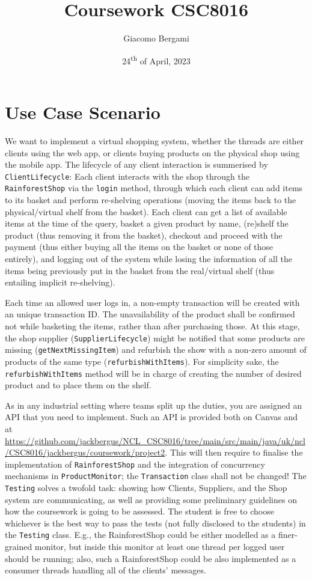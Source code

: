 \documentclass{article}
\title{Coursework CSC8016}
\author{Giacomo Bergami}
\date{24\textsuperscript{th} of April, 2023}
\begin{document}
	\maketitle
	
	\section*{Use Case Scenario}
We want to implement a virtual shopping system, whether the threads are
either clients using the web app, or clients buying products on the physical shop using the mobile app. The lifecycle of any client interaction is summerised by \texttt{ClientLifecycle}: Each client interacts with the shop through the \texttt{RainforestShop} via the \texttt{login} method, through which each client can add items to its basket and perform re-shelving operations (moving the items back to the physical/virtual shelf from the basket). Each client can get a list of available items at the time of the query, basket a given product by name, (re)shelf the product (thus removing it from the basket), checkout and proceed with the payment (thus either buying all the items on the basket or none of those entirely), and logging out of the system while losing the information of all the items being previously put in the basket from the real/virtual shelf (thus entailing implicit re-shelving).


{Each time an allowed user logs in, a non-empty transaction will be created with an unique transaction ID. The unavailability of the product shall be confirmed not while basketing the items, rather than after purchasing those. At this stage, the shop supplier (\texttt{SupplierLifecycle}) might be notified that some products are missing (\texttt{getNextMissingItem}) and refurbish the show with a non-zero amount of products of the same type (\texttt{refurbishWithItems}). For simplicity sake, the \texttt{refurbishWithItems} method will be in charge of creating the number of desired product and to place them on the shelf. }


As in any industrial setting where teams split up the duties,
you are assigned an API that you need to implement. Such an API is provided both on Canvas and at \url{https://github.com/jackbergus/NCL_CSC8016/tree/main/src/main/java/uk/ncl/CSC8016/jackbergus/coursework/project2}. This will then require to finalise the implementation of  \texttt{RainforestShop} and the integration of concurrency mechanisms in \texttt{ProductMonitor}; the \texttt{Transaction} class shall not be changed! The \texttt{Testing} solves a twofold task: showing how Clients, Suppliers, and the Shop system are communicating, as well as providing some preliminary guidelines on how the coursework is going to be assessed. The student is free to choose whichever is the best way to pass the tests (not fully disclosed to the students) in the \texttt{Testing} class. E.g., the RainforestShop could be either modelled as a finer-grained monitor, but inside this monitor at least one thread per logged user should be running; also, such a RainforestShop could be also implemented as a consumer threads handling all of the clients' messages. 
	
\end{document}
